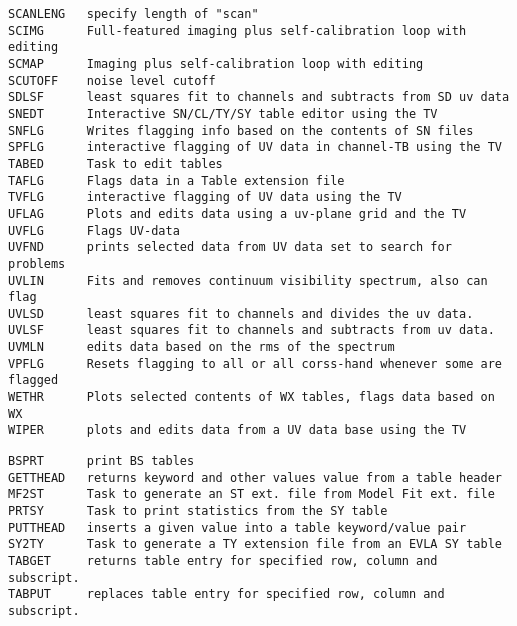 \begin{verbatim}
SCANLENG   specify length of "scan"
SCIMG      Full-featured imaging plus self-calibration loop with editing
SCMAP      Imaging plus self-calibration loop with editing
SCUTOFF    noise level cutoff
SDLSF      least squares fit to channels and subtracts from SD uv data
SNEDT      Interactive SN/CL/TY/SY table editor using the TV
SNFLG      Writes flagging info based on the contents of SN files
SPFLG      interactive flagging of UV data in channel-TB using the TV
TABED      Task to edit tables
TAFLG      Flags data in a Table extension file
TVFLG      interactive flagging of UV data using the TV
UFLAG      Plots and edits data using a uv-plane grid and the TV
UVFLG      Flags UV-data
UVFND      prints selected data from UV data set to search for problems
UVLIN      Fits and removes continuum visibility spectrum, also can flag
UVLSD      least squares fit to channels and divides the uv data.
UVLSF      least squares fit to channels and subtracts from uv data.
UVMLN      edits data based on the rms of the spectrum
VPFLG      Resets flagging to all or all corss-hand whenever some are flagged
WETHR      Plots selected contents of WX tables, flags data based on WX
WIPER      plots and edits data from a UV data base using the TV
\end{verbatim}\eve


\vskip 0.5pt
\bbve\begin{verbatim}
BSPRT      print BS tables
GETTHEAD   returns keyword and other values value from a table header
MF2ST      Task to generate an ST ext. file from Model Fit ext. file
PRTSY      Task to print statistics from the SY table
PUTTHEAD   inserts a given value into a table keyword/value pair
SY2TY      Task to generate a TY extension file from an EVLA SY table
TABGET     returns table entry for specified row, column and subscript.
TABPUT     replaces table entry for specified row, column and subscript.
\end{verbatim}\eve

\vfill\eject
{}

